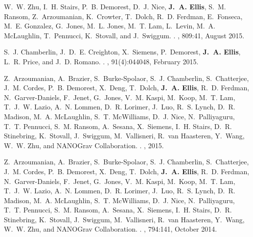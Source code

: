 \documentclass[11pt,letterpaper,sans]{moderncv} %
\def\prd{{Phys. Rev.} D}
\def\apj{{Astrophys. J.}}
\begin{document}
\begin{thebibliography}{10}
W.~W. {Zhu}, I.~H. {Stairs}, P.~B. {Demorest}, D.~J. {Nice}, \textbf{J.~A. {Ellis}},
  S.~M. {Ransom}, Z.~{Arzoumanian}, K.~{Crowter}, T.~{Dolch}, R.~D. {Ferdman},
  E.~{Fonseca}, M.~E. {Gonzalez}, G.~{Jones}, M.~L. {Jones}, M.~T. {Lam},
  L.~{Levin}, M.~A. {McLaughlin}, T.~{Pennucci}, K.~{Stovall}, and
  J.~{Swiggum}.
.
\newblock {\em \apj}, 809:41, August 2015.

S.~J. {Chamberlin}, J.~D.~E. {Creighton}, X.~{Siemens}, P.~{Demorest},
  \textbf{J.~A. {Ellis}}, L.~R. {Price}, and J.~D. {Romano}.
.
\newblock {\em \prd}, 91(4):044048, February 2015.

Z.~{Arzoumanian}, A.~{Brazier}, S.~{Burke-Spolaor}, S.~J. {Chamberlin},
  S.~{Chatterjee}, J.~M. {Cordes}, P.~B. {Demorest}, X.~{Deng}, T.~{Dolch},
  \textbf{J.~A. {Ellis}}, R.~D. {Ferdman}, N.~{Garver-Daniels}, F.~{Jenet}, G.~{Jones},
  V.~M. {Kaspi}, M.~{Koop}, M.~T. {Lam}, T.~J.~W. {Lazio}, A.~N. {Lommen},
  D.~R. {Lorimer}, J.~{Luo}, R.~S. {Lynch}, D.~R. {Madison}, M.~A.
  {McLaughlin}, S.~T. {McWilliams}, D.~J. {Nice}, N.~{Palliyaguru}, T.~T.
  {Pennucci}, S.~M. {Ransom}, A.~{Sesana}, X.~{Siemens}, I.~H. {Stairs}, D.~R.
  {Stinebring}, K.~{Stovall}, J.~{Swiggum}, M.~{Vallisneri}, R.~{van
  Haasteren}, Y.~{Wang}, W.~W. {Zhu}, and {NANOGrav Collaboration}.
.
, 2015.


Z.~{Arzoumanian}, A.~{Brazier}, S.~{Burke-Spolaor}, S.~J. {Chamberlin},
  S.~{Chatterjee}, J.~M. {Cordes}, P.~B. {Demorest}, X.~{Deng}, T.~{Dolch},
  \textbf{J.~A. {Ellis}}, R.~D. {Ferdman}, N.~{Garver-Daniels}, F.~{Jenet}, G.~{Jones},
  V.~M. {Kaspi}, M.~{Koop}, M.~T. {Lam}, T.~J.~W. {Lazio}, A.~N. {Lommen},
  D.~R. {Lorimer}, J.~{Luo}, R.~S. {Lynch}, D.~R. {Madison}, M.~A.
  {McLaughlin}, S.~T. {McWilliams}, D.~J. {Nice}, N.~{Palliyaguru}, T.~T.
  {Pennucci}, S.~M. {Ransom}, A.~{Sesana}, X.~{Siemens}, I.~H. {Stairs}, D.~R.
  {Stinebring}, K.~{Stovall}, J.~{Swiggum}, M.~{Vallisneri}, R.~{van
  Haasteren}, Y.~{Wang}, W.~W. {Zhu}, and {NANOGrav Collaboration}.
.
\newblock {\em \apj}, 794:141, October 2014.



\end{thebibliography}
\end{document}
